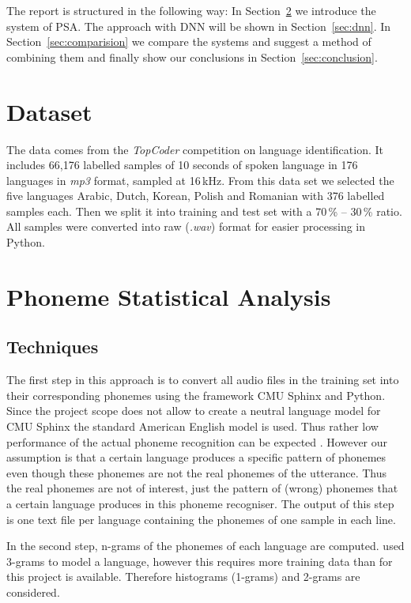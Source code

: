 \documentclass{article}
\begin{document}
The report is structured in the following way: In Section~\ref{sec:psa} we introduce the system of PSA. The approach with DNN will be shown in Section~\ref{sec:dnn}. In Section~\ref{sec:comparision} we compare the systems and suggest a method of combining them and finally show our conclusions in Section~\ref{sec:conclusion}. 

\section{Dataset}
\label{sec:dataset}
The data comes from the \textit{TopCoder} competition on language identification. It includes 66,176 labelled samples of 10 seconds of spoken language in 176 languages in \textit{mp3} format, sampled at 16\,kHz. From this data set we selected the five languages Arabic,  Dutch,  Korean,  Polish  and  Romanian with 376 labelled samples each. Then we split it into training and test set with a 70\,\% -- 30\,\% ratio. All samples were converted into raw (\textit{.wav}) format for easier processing in Python.

\section{Phoneme Statistical Analysis}
\label{sec:psa}
\subsection{Techniques}
The first step in this approach is to convert all audio files in the training set into their corresponding phonemes using the framework CMU Sphinx \cite{lamere2003cmu} and Python. Since the project scope does not allow to create a neutral language model for CMU Sphinx the standard American English model is used. Thus rather low performance of the actual phoneme recognition can be expected \cite{kepuska2017comparing}. However our assumption is that a certain language produces a specific pattern of phonemes even though these phonemes are not the real phonemes of the utterance. Thus the real phonemes are not of interest, just the pattern of (wrong) phonemes that a certain language produces in this phoneme recogniser. The output of this step is one text file per language containing the phonemes of one sample in each line.

In the second step, n-grams of the phonemes of each language are computed. \cite{matejka2005phonotactic} used 3-grams to model a language, however this requires more training data than for this project is available. Therefore histograms (1-grams) and 2-grams are considered.
\end{document}
